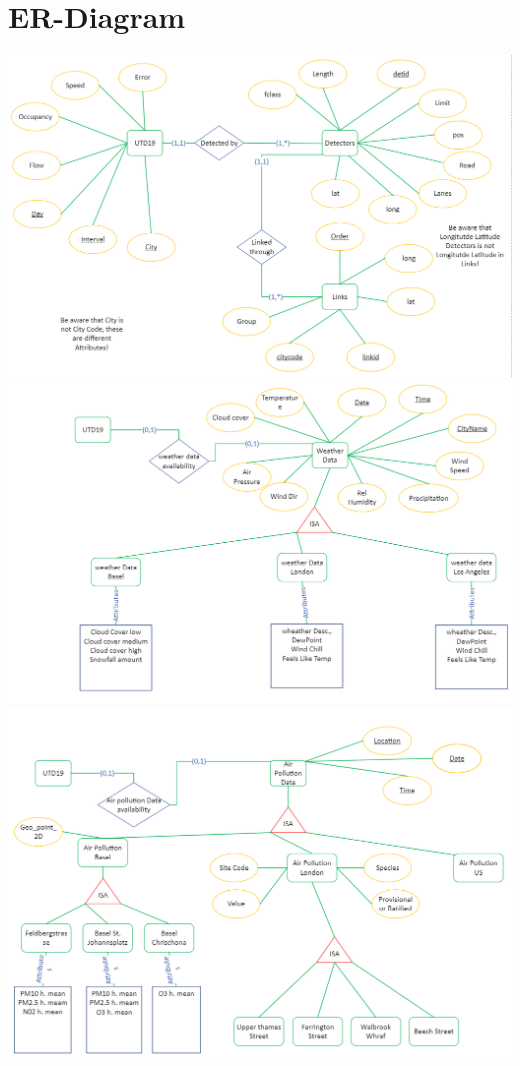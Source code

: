 \documentclass{article}
\begin{document}
\section{ER-Diagram}

\includegraphics[scale=0.5]{first.png}\\
\includegraphics[scale=0.5]{second.png}\\
\includegraphics[scale=0.6]{third.png}
\end{document}
